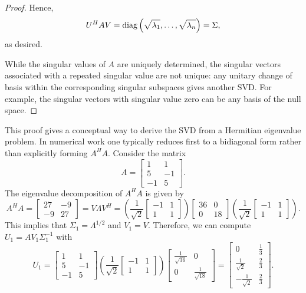 \begin{proof}
Hence,
\begin{equation*}
U^H A V = \mathrm{diag} \left( \sqrt{\lambda_1}, \ldots, \sqrt{\lambda_n} \right)
= \Sigma ,
\end{equation*}
as desired.

While the singular values of $A$ are uniquely determined, the singular vectors associated with a repeated singular value are not unique: any unitary change of basis within the corresponding singular subspaces gives another SVD.
For example, the singular vectors with singular value zero can be any basis of the null space.
\end{proof}

This proof gives a conceptual way to derive the SVD from a Hermitian eigenvalue problem. 
In numerical work one typically reduces first to a bidiagonal form rather than explicitly forming $A^HA$.
Consider the matrix 
\[ A = \left[ \begin{array}{cc}
1 & 1 \\
5 & -1 \\
-1 & 5 
\end{array} \right]. \]
The eigenvalue decomposition of $A^H A$ is given by
\[ A^H A = \left[ \begin{array}{cc}
27 & -9 \\
-9 & 27
\end{array} \right]
= V \Lambda V^H
= \left( \frac{1}{\sqrt{2}}\left[ \begin{array}{cc}
-1 & 1 \\
1 & 1 
\end{array} \right] \right)
\left[ \begin{array}{cc}
36 & 0 \\
0 & 18
\end{array} \right]
\left( \frac{1}{\sqrt{2}} \left[ \begin{array}{cc}
-1 & 1 \\
1 & 1 
\end{array} \right] \right).
\]
This implies that $\Sigma_1 = \Lambda^{1/2}$ and $V_1 = V$.
Therefore, we can compute $U_1 = A V_1 \Sigma_1^{-1}$ with
\[ U_1 = \left[ \begin{array}{cc}
1 & 1 \\
5 & -1 \\
-1 & 5 
\end{array} \right]
\left( \frac{1}{\sqrt{2}} \left[ \begin{array}{cc}
-1 & 1 \\
1 & 1
\end{array} \right] \right)
\left[ \begin{array}{cc}
\frac{1}{\sqrt{36}} & 0 \\
0 & \frac{1}{\sqrt{18}}
\end{array} \right]
= \left[ \begin{array}{cc}
0 & \frac{1}{3} \\
\frac{1}{\sqrt{2}} & \frac{2}{3}  \\
-\frac{1}{\sqrt{2}} & \frac{2}{3} 
\end{array} \right]. \]
